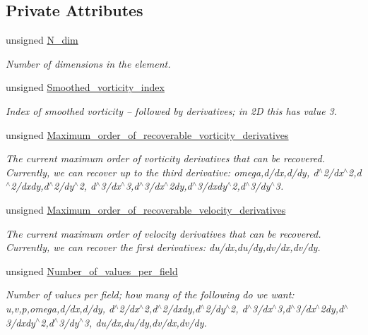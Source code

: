 \subsection*{Private Attributes}
\begin{DoxyCompactItemize}
\item 
unsigned \hyperlink{classoomph_1_1VorticitySmootherElement_afc0f746d35e11a455fe36df7be1069ec}{N\+\_\+dim}
\begin{DoxyCompactList}\small\item\em Number of dimensions in the element. \end{DoxyCompactList}\item 
unsigned \hyperlink{classoomph_1_1VorticitySmootherElement_a15a33ab6804cbd945f67db0cf81ff6bc}{Smoothed\+\_\+vorticity\+\_\+index}
\begin{DoxyCompactList}\small\item\em Index of smoothed vorticity -- followed by derivatives; in 2D this has value 3. \end{DoxyCompactList}\item 
unsigned \hyperlink{classoomph_1_1VorticitySmootherElement_a7753f3129fb23347ef757af45cc7b221}{Maximum\+\_\+order\+\_\+of\+\_\+recoverable\+\_\+vorticity\+\_\+derivatives}
\begin{DoxyCompactList}\small\item\em The current maximum order of vorticity derivatives that can be recovered. Currently, we can recover up to the third derivative\+: omega,d/dx,d/dy, d$^\wedge$2/dx$^\wedge$2,d$^\wedge$2/dxdy,d$^\wedge$2/dy$^\wedge$2, d$^\wedge$3/dx$^\wedge$3,d$^\wedge$3/dx$^\wedge$2dy,d$^\wedge$3/dxdy$^\wedge$2,d$^\wedge$3/dy$^\wedge$3. \end{DoxyCompactList}\item 
unsigned \hyperlink{classoomph_1_1VorticitySmootherElement_a6ca5c212c0bd7db1a492bbf255f247cc}{Maximum\+\_\+order\+\_\+of\+\_\+recoverable\+\_\+velocity\+\_\+derivatives}
\begin{DoxyCompactList}\small\item\em The current maximum order of velocity derivatives that can be recovered. Currently, we can recover the first derivatives\+: du/dx,du/dy,dv/dx,dv/dy. \end{DoxyCompactList}\item 
unsigned \hyperlink{classoomph_1_1VorticitySmootherElement_ab25f6ce614cbcca04d1dc8e72baf80e6}{Number\+\_\+of\+\_\+values\+\_\+per\+\_\+field}
\begin{DoxyCompactList}\small\item\em Number of values per field; how many of the following do we want\+: u,v,p,omega,d/dx,d/dy, d$^\wedge$2/dx$^\wedge$2,d$^\wedge$2/dxdy,d$^\wedge$2/dy$^\wedge$2, d$^\wedge$3/dx$^\wedge$3,d$^\wedge$3/dx$^\wedge$2dy,d$^\wedge$3/dxdy$^\wedge$2,d$^\wedge$3/dy$^\wedge$3, du/dx,du/dy,dv/dx,dv/dy. \end{DoxyCompactList}\item 

\end{DoxyCompactItemize}
